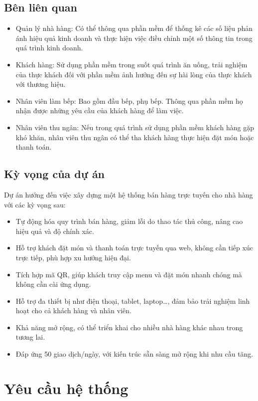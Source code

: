 \documentclass[a4paper]{article}
\begin{document}
\subsection{Bên liên quan}

\begin{itemize}
    \item Quản lý nhà hàng: Có thể thông qua phần mềm để thống kê các số liệu phản ánh hiệu quả kinh doanh và thực hiện việc điều chỉnh một số thông tin trong quá trình kinh doanh.
    \item Khách hàng: Sử dụng phần mềm trong suốt quá trình ăn uống, trải nghiệm của thực khách đối với phần mềm ảnh hưởng đến sự hài lòng của thực khách với thương hiệu.
    \item Nhân viên làm bếp: Bao gồm đầu bếp, phụ bếp. Thông qua phần mềm họ nhận được những yêu cầu của khách hàng để làm việc.
    \item Nhân viên thu ngân: Nếu trong quá trình sử dụng phần mềm khách hàng gặp khó khăn, nhân viên thu ngân có thể tha khách hàng thực hiện đặt món hoặc thanh toán.
\end{itemize}

\subsection{Kỳ vọng của dự án}
\quad Dự án hướng đến việc xây dựng một hệ thống bán hàng trực tuyến cho nhà hàng với các kỳ vọng sau:
\begin{itemize}
    \item Tự động hóa quy trình bán hàng, giảm lỗi do thao tác thủ công, nâng cao hiệu quả và độ chính xác.
    \item Hỗ trợ khách đặt món và thanh toán trực tuyến qua web, không cần tiếp xúc trực tiếp, phù hợp xu hướng hiện đại.
    \item Tích hợp mã QR, giúp khách truy cập menu và đặt món nhanh chóng mà không cần cài ứng dụng.
    \item Hỗ trợ đa thiết bị như điện thoại, tablet, laptop…, đảm bảo trải nghiệm linh hoạt cho cả khách hàng và nhân viên.
    \item Khả năng mở rộng, có thể triển khai cho nhiều nhà hàng khác nhau trong tương lai.
    \item Đáp ứng 50 giao dịch/ngày, với kiến trúc sẵn sàng mở rộng khi nhu cầu tăng.
\end{itemize}

\section{Yêu cầu hệ thống}
\end{document}
